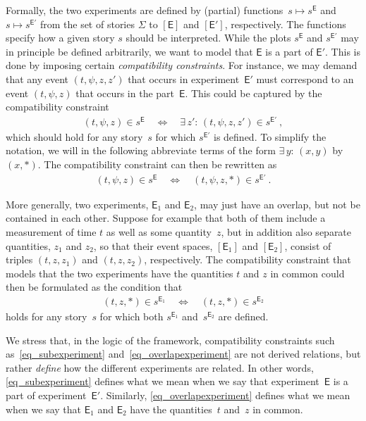 \documentclass[12pt]{article}
\theoremstyle{plain}
\theoremstyle{definition}
\newcommand*{\Exp}{\mathsf{E}}
\newcommand*{\Expp}{\mathsf{E'}}
\newcommand*{\Expone}{\mathsf{E}_1}
\newcommand*{\Exptwo}{\mathsf{E}_2}
\begin{document}
Formally,  the two experiments are defined by (partial) functions~$s \mapsto s^{\Exp}$ and  $s \mapsto s^{\Expp}$ from the set of stories $\Sigma$ to $[\Exp]$ and $[\Expp]$, respectively.  The functions specify how a given story $s$ should be interpreted. While the plots $s^{\Exp}$ and $s^{\Expp}$ may in principle be defined arbitrarily, we want to model that $\Exp$ is a part of $\Expp$. This is done by imposing certain \emph{compatibility constraints}. For instance, we may demand that any event $(t, \psi, z, z')$ that occurs in experiment~$\Expp$ must correspond to an event $(t, \psi, z)$ that occurs in the part~$\Exp$. This could be captured by the compatibility constraint
\begin{align*}  
  (t, \psi, z) \in s^{\Exp} \quad \iff \quad \exists \, z' : \, (t, \psi, z, z') \in s^{\Expp}  \ ,
\end{align*} 
which should hold for any story~$s$ for which $s^{\Expp}$ is defined.  To simplify the notation, we will in the following abbreviate terms of the form $\exists \, y : \, (x, y)$ by $(x, *)$. The compatibility constraint can then be rewritten as 
\begin{align} \label{eq_subexperiment}
  (t, \psi, z) \in s^{\Exp} \quad \iff \quad (t, \psi, z, *) \in s^{\Expp}  \ .
\end{align} 

More generally, two experiments, $\Expone$ and $\Exptwo$, may just have an overlap, but not be contained in each other. Suppose for example that both of them include a measurement of  time $t$ as well as some quantity~$z$, but in addition also separate quantities, $z_1$ and $z_2$, so that their event spaces, $[\Expone]$ and $[\Exptwo]$, consist of triples $(t, z, z_1)$ and $(t, z, z_2)$, respectively.  The compatibility constraint that models that the two experiments have the quantities $t$ and $z$ in common could then be formulated as the condition that
\begin{align} \label{eq_overlapexperiment}
  (t, z, *) \in s^{\Expone} \quad \iff \quad (t, z, *) \in s^{\Exptwo} 
\end{align} 
holds for any story~$s$ for which both $s^{\Expone}$ and~$s^{\Exptwo}$ are defined. 

We stress that, in the logic of the framework, compatibility constraints such as~\eqref{eq_subexperiment} and~\eqref{eq_overlapexperiment} are not derived relations, but rather \emph{define} how the different experiments are related. In other words, \eqref{eq_subexperiment} defines what we mean when we say that experiment~$\Exp$ is a part of experiment~$\Expp$. Similarly, \eqref{eq_overlapexperiment} defines what we mean when we say that $\Expone$ and $\Exptwo$ have the quantities~$t$ and~$z$ in common. 
\end{document}
